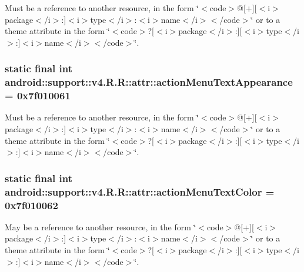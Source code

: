 Must be a reference to another resource, in the form \char`\"{}$<$code$>$@\mbox{[}+\mbox{]}\mbox{[}$<$i$>$package$<$/i$>$:\mbox{]}$<$i$>$type$<$/i$>$:$<$i$>$name$<$/i$>$$<$/code$>$\char`\"{} or to a theme attribute in the form \char`\"{}$<$code$>$?\mbox{[}$<$i$>$package$<$/i$>$:\mbox{]}\mbox{[}$<$i$>$type$<$/i$>$:\mbox{]}$<$i$>$name$<$/i$>$$<$/code$>$\char`\"{}. \hypertarget{classandroid_1_1support_1_1v4_1_1_r_1_1attr_422ed2aedf8bd2bc9b9104d2f184ee07}{
\subsubsection[{actionMenuTextAppearance}]{\setlength{\rightskip}{0pt plus 5cm}static final int android::support::v4.R.R::attr::actionMenuTextAppearance = 0x7f010061}}
\label{classandroid_1_1support_1_1v4_1_1_r_1_1attr_422ed2aedf8bd2bc9b9104d2f184ee07}


Must be a reference to another resource, in the form \char`\"{}$<$code$>$@\mbox{[}+\mbox{]}\mbox{[}$<$i$>$package$<$/i$>$:\mbox{]}$<$i$>$type$<$/i$>$:$<$i$>$name$<$/i$>$$<$/code$>$\char`\"{} or to a theme attribute in the form \char`\"{}$<$code$>$?\mbox{[}$<$i$>$package$<$/i$>$:\mbox{]}\mbox{[}$<$i$>$type$<$/i$>$:\mbox{]}$<$i$>$name$<$/i$>$$<$/code$>$\char`\"{}. \hypertarget{classandroid_1_1support_1_1v4_1_1_r_1_1attr_27b8f26ccf5b14d7417b185de70ed9c3}{
\subsubsection[{actionMenuTextColor}]{\setlength{\rightskip}{0pt plus 5cm}static final int android::support::v4.R.R::attr::actionMenuTextColor = 0x7f010062}}
\label{classandroid_1_1support_1_1v4_1_1_r_1_1attr_27b8f26ccf5b14d7417b185de70ed9c3}


May be a reference to another resource, in the form \char`\"{}$<$code$>$@\mbox{[}+\mbox{]}\mbox{[}$<$i$>$package$<$/i$>$:\mbox{]}$<$i$>$type$<$/i$>$:$<$i$>$name$<$/i$>$$<$/code$>$\char`\"{} or to a theme attribute in the form \char`\"{}$<$code$>$?\mbox{[}$<$i$>$package$<$/i$>$:\mbox{]}\mbox{[}$<$i$>$type$<$/i$>$:\mbox{]}$<$i$>$name$<$/i$>$$<$/code$>$\char`\"{}. 

